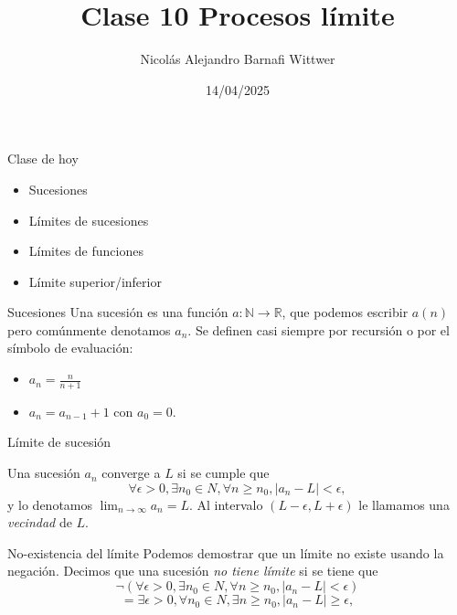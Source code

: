 \documentclass[14pt,aspectratio=169,xcolor=dvipsnames]{beamer}
\title[short title]{Clase 10 Procesos límite}
\subtitle{}
\author[NA Barnafi] {Nicolás Alejandro Barnafi Wittwer}
\institute[UC|CMM] 
{
    Pontificia Universidad Católica de Chile \\
    Centro de Modelamiento Matemático
}
\date{14/04/2025}
\newcommand{\R}{\mathbb{R}}
\begin{document}
\begin{frame}
    \maketitle
\end{frame}
\begin{frame}{Clase de hoy}
    \begin{itemize}
        \item Sucesiones
        \item Límites de sucesiones
        \item Límites de funciones
        \item Límite superior/inferior
    \end{itemize}

    \vspace{1cm}
\end{frame}
\begin{frame}{Sucesiones}
    Una sucesión es una función $a:\mathbb N\to \R$, que podemos escribir $a(n)$ pero comúnmente denotamos $a_n$. Se definen casi siempre por recursión o por el símbolo de evaluación:
    \begin{itemize}
        \item $a_n = \frac{n}{n+1}$
        \item $a_n = a_{n-1} + 1$ con $a_0 = 0$. 
    \end{itemize}
\end{frame}
\begin{frame}{Límite de sucesión}
    \begin{block}{}
        Una sucesión $a_n$ converge a $L$ si se cumple que
            $$ \forall \epsilon > 0, \exists n_0\in N, \forall n\geq n_0, |a_n - L | < \epsilon, $$
            y lo denotamos $\lim_{n\to\infty} a_n = L$. Al intervalo $(L-\epsilon, L+\epsilon)$ le llamamos una \emph{vecindad} de $L$.
    \end{block}
\end{frame}
\begin{frame}{No-existencia del límite}
    Podemos demostrar que un límite no existe usando la negación. Decimos que una sucesión \emph{no tiene límite} si se tiene que
            $$ \neg(\forall \epsilon > 0, \exists n_0\in N, \forall n\geq n_0, |a_n - L | < \epsilon) $$
            $$ =\exists \epsilon > 0, \forall n_0\in N, \exists n\geq n_0, |a_n - L | \geq \epsilon, $$
\end{frame}
\end{document}
